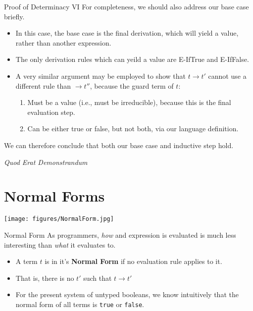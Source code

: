 \documentclass[11pt]{beamer}
\begin{document}
\begin{frame}[fragile=singleslide]{Proof of Determinacy VI}
For completeness, we should also address our base case briefly.
\begin{itemize}
\item In this case, the base case is the final derivation, which will yield a value, rather than another expression.  
\item The only derivation rules which can yeild a value are E-IfTrue and E-IfFalse.
\item A very similar argument may be employed to show that $t \rightarrow t'$ cannot use a different rule than $\rightarrow t''$, because the guard term of $t$:
\begin{enumerate}
\item Must be a value (i.e., must be irreducible), because this is the final evaluation step.
\item Can be either true or false, but not both, via our language definition.
\end{enumerate}
\end{itemize}
We can therefore conclude that both our base case and inductive step hold.
\begin{center}
\emph{Quod Erat Demonstrandum}
\end{center}
\end{frame}


\section[Normal Forms]{Normal Forms}
\begin{frame}[fragile=singleslide]{}
\begin{center}
\texttt{[image: figures/NormalForm.jpg]}
\end{center}
\end{frame}

\begin{frame}[fragile=singleslide]{Normal Form}
As programmers, \emph{how} and expression is evaluated is much less interesting than \emph{what} it evaluates to.
\begin{itemize}
\item A term $t$ is in it's \textbf{Normal Form} if no evaluation rule applies to it. 
\item That is, there is no $t'$ such that $t \rightarrow t'$
\item For the present system of untyped booleans, we know intuitively that the normal form of all terms is \texttt{true} or \texttt{false}.
\end{itemize}
\end{frame}
\end{document}
